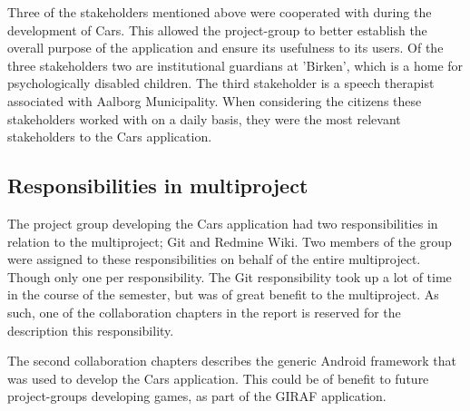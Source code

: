 \documentclass[a4paper,12pt,english]{article}
\begin{document}
Three of the stakeholders mentioned above were cooperated with during the development of Cars.
This allowed the project-group to better establish the overall purpose of the application and ensure its usefulness to its users.
Of the three stakeholders two are institutional guardians at 'Birken', which is a home for psychologically disabled children.
The third stakeholder is a speech therapist associated with Aalborg Municipality.
When considering the citizens these stakeholders worked with on a daily basis, they were the most relevant stakeholders to the Cars application.

\subsection{Responsibilities in multiproject}
The project group developing the Cars application had two responsibilities in relation to the multiproject; Git and Redmine Wiki.
Two members of the group were assigned to these responsibilities on behalf of the entire multiproject.
Though only one per responsibility.
The Git responsibility took up a lot of time in the course of the semester, but was of great benefit to the multiproject.
As such, one of the collaboration chapters in the report is reserved for the description this responsibility.

The second collaboration chapters describes the generic Android framework that was used to develop the Cars application.
This could be of benefit to future project-groups developing games, as part of the GIRAF application.
\end{document}
